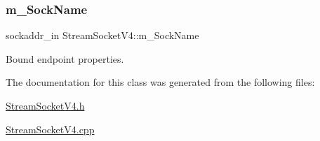 \subsubsection{\texorpdfstring{m\+\_\+\+Sock\+Name}{m\_SockName}}
{\footnotesize\ttfamily sockaddr\+\_\+in Stream\+Socket\+V4\+::m\+\_\+\+Sock\+Name\hspace{0.3cm}{\ttfamily [protected]}}



Bound endpoint properties. 



The documentation for this class was generated from the following files\+:\begin{DoxyCompactItemize}
\item 
\hyperlink{StreamSocketV4_8h}{Stream\+Socket\+V4.\+h}\item 
\hyperlink{StreamSocketV4_8cpp}{Stream\+Socket\+V4.\+cpp}\end{DoxyCompactItemize}

